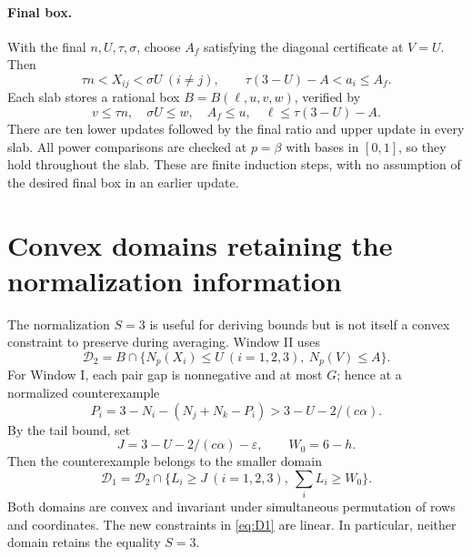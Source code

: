 \documentclass[11pt,a4paper]{article}
\theoremstyle{remark}\newtheorem{remark}[theorem]{Remark}
\newcommand{\Np}{N_p}\newcommand{\F}{F_{p,K}}
\begin{document}
\paragraph{Final box.}
With the final $n,U,\tau,\sigma$, choose $A_f$ satisfying the diagonal
certificate at $V=U$. Then
\begin{equation}\label{eq:finalbounds}
\tau n<X_{ij}<\sigma U\ (i\ne j),\qquad
\tau(3-U)-A<a_i\le A_f.
\end{equation}
Each slab stores a rational box $B=B(\ell,u,v,w)$, verified by
\begin{equation}\label{eq:boxchecks}
v\le\tau n,\quad \sigma U\le w,\quad A_f\le u,\quad
\ell\le\tau(3-U)-A.
\end{equation}
There are ten lower updates followed by the final ratio and upper update
in every slab. All power comparisons are checked at $p=\beta$ with bases
in $[0,1]$, so they hold throughout the slab. These are finite induction
steps, with no assumption of the desired final box in an earlier update.

\section{Convex domains retaining the normalization information}\label{sec:domain}
The normalization $S=3$ is useful for deriving bounds but is not itself a
convex constraint to preserve during averaging. Window II uses
\begin{equation}\label{eq:D2}
\mathcal D_2=B\cap\{\Np(X_i)\le U\ (i=1,2,3),\ \Np(V)\le A\}.
\end{equation}
For Window I, each pair gap is nonnegative and at most $G$; hence at a
normalized counterexample
\[
P_i=3-N_i-(N_j+N_k-P_i)>3-U-2/(c\alpha).
\]
By the tail bound, set
\begin{equation}\label{eq:floors}
J=3-U-2/(c\alpha)-\varepsilon,\qquad W_0=6-h.
\end{equation}
Then the counterexample belongs to the smaller domain
\begin{equation}\label{eq:D1}
\mathcal D_1=\mathcal D_2\cap\{L_i\ge J\ (i=1,2,3),\ \sum_iL_i\ge W_0\}.
\end{equation}
Both domains are convex and invariant under simultaneous permutation of
rows and coordinates. The new constraints in \eqref{eq:D1} are linear.
In particular, neither domain retains the equality $S=3$.
\end{document}
